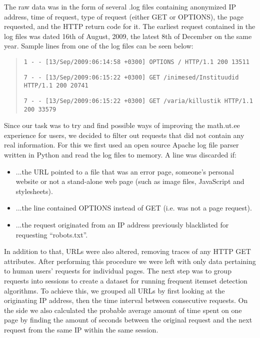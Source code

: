 \documentclass[english,12pt,a4paper]{article}
\begin{document}
The raw data was in the form of several .log files containing anonymized 
IP address, time of request, type of request (either GET or OPTIONS),
the page requested, and the HTTP return code for it. The earliest
request contained in the log files was dated 16th of August, 2009,
the latest 8th of December on the same year. Sample lines from one
of the log files can be seen below:
\begin{quotation}
\begin{singlespace}
\texttt{1 - - {[}13/Sep/2009:06:14:58 +0300{]} \textquotedbl{}OPTIONS
/ HTTP/1.1\textquotedbl{} 200 13511 }

\texttt{7 - - {[}13/Sep/2009:06:15:22 +0300{]} \textquotedbl{}GET
/inimesed/Instituudid HTTP/1.1\textquotedbl{} 200 20741 }

\texttt{7 - - {[}13/Sep/2009:06:15:22 +0300{]} \textquotedbl{}GET
/varia/killustik HTTP/1.1\textquotedbl{} 200 33579}\end{singlespace}

\end{quotation}
Since our task was to try and find possible ways of improving the
math.ut.ee experience for users, we decided to filter out requests
that did not contain any real information. For this we first used
an open source Apache log file parser written in Python and read the
log files to memory. A line was discarded if:
\begin{itemize}
\item ...the URL pointed to a file that was an error page, someone's personal
website or not a stand-alone web page (such as image files, JavaScript
and stylesheets).
\item ...the line contained OPTIONS instead of GET (i.e. was not a page
request).
\item ...the request originated from an IP address previously blacklisted
for requesting {}``robots.txt''.
\end{itemize}
In addition to that, URLs were also altered, removing traces of any
HTTP GET attributes. After performing this procedure we were left
with only data pertaining to human users' requests for individual
pages. The next step was to group requests into sessions to create
a dataset for running frequent itemset detection algorithms. To achieve
this, we grouped all URLs by first looking at the originating IP address,
then the time interval between consecutive requests. On the side we
also calculated the probable average amount of time spent on one page
by finding the amount of seconds between the original request and
the next request from the same IP within the same session.
\end{document}
